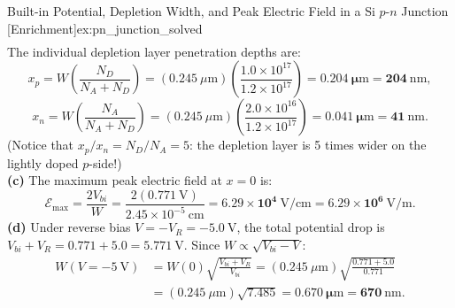 \documentclass[11pt,a4paper]{article}
\begin{document}
\begin{examplebox}{Built-in Potential, Depletion Width, and Peak Electric Field in a Si $p$-$n$ Junction \textnormal{\color{purple!75!black}[Enrichment]}}{ex:pn_junction_solved}
\begin{align*}
\end{align*}
The individual depletion layer penetration depths are:
\[
    x_p = W\left(\frac{N_D}{N_A + N_D}\right) = (0.245\ \mu\mathrm{m})\left(\frac{1.0\times 10^{17}}{1.2\times 10^{17}}\right) = \mathbf{0.204\ \mu\mathrm{m} = 204\ \mathrm{nm}},
\]
\[
    x_n = W\left(\frac{N_A}{N_A + N_D}\right) = (0.245\ \mu\mathrm{m})\left(\frac{2.0\times 10^{16}}{1.2\times 10^{17}}\right) = \mathbf{0.041\ \mu\mathrm{m} = 41\ \mathrm{nm}}.
\]
(Notice that $x_p/x_n = N_D/N_A = 5$: the depletion layer is 5 times wider on the lightly doped $p$-side!)\\
\textbf{(c)} The maximum peak electric field at $x = 0$ is:
\[
    \mathcal{E}_{\max} = \frac{2 V_{bi}}{W} = \frac{2(0.771\ \mathrm{V})}{2.45\times 10^{-5}\ \mathrm{cm}} = \mathbf{6.29\times 10^4\ \mathrm{V/cm} = 6.29\times 10^6\ \mathrm{V/m}}.
\]
\textbf{(d)} Under reverse bias $V = -V_R = -5.0\ \mathrm{V}$, the total potential drop is $V_{bi} + V_R = 0.771 + 5.0 = 5.771\ \mathrm{V}$. Since $W \propto \sqrt{V_{bi} - V}$:
\begin{align*}
    W(V = -5\ \mathrm{V}) &= W(0)\sqrt{\frac{V_{bi} + V_R}{V_{bi}}} = (0.245\ \mu\mathrm{m})\sqrt{\frac{0.771 + 5.0}{0.771}} \\
    &= (0.245\ \mu\mathrm{m})\sqrt{7.485} = \mathbf{0.670\ \mu\mathrm{m} = 670\ \mathrm{nm}}.
\end{align*}
\end{examplebox}
\end{document}

